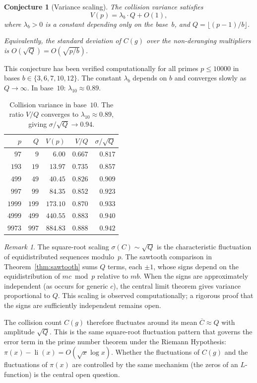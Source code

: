 \documentclass[12pt]{amsart}
\newtheorem{conjecture}[theorem]{Conjecture}
\theoremstyle{definition}
\theoremstyle{remark}
\newtheorem{remark}[theorem]{Remark}
\begin{document}
\begin{conjecture}[Variance scaling]\label{conj:variance}
The collision variance satisfies
\[
V(p) = \lambda_b \cdot Q + O(1),
\]
where $\lambda_b > 0$ is a constant depending only on the
base~$b$, and $Q = \lfloor (p{-}1)/b \rfloor$.

Equivalently, the standard deviation of $C(g)$ over the
non-deranging multipliers is $O(\sqrt{Q}) = O(\sqrt{p/b})$.
\end{conjecture}

This conjecture has been verified computationally for all primes
$p \le 10000$ in bases $b \in \{3, 6, 7, 10, 12\}$. The
constant $\lambda_b$ depends on $b$ and converges slowly as
$Q \to \infty$. In base~$10$: $\lambda_{10} \approx 0.89$.

\begin{table}[h]
\centering
\begin{tabular}{rrrrr}
\toprule
$p$ & $Q$ & $V(p)$ & $V/Q$ & $\sigma/\!\sqrt{Q}$ \\
\midrule
$97$ & $9$ & $6.00$ & $0.667$ & $0.817$ \\
$193$ & $19$ & $13.97$ & $0.735$ & $0.857$ \\
$499$ & $49$ & $40.45$ & $0.826$ & $0.909$ \\
$997$ & $99$ & $84.35$ & $0.852$ & $0.923$ \\
$1999$ & $199$ & $173.10$ & $0.870$ & $0.933$ \\
$4999$ & $499$ & $440.55$ & $0.883$ & $0.940$ \\
$9973$ & $997$ & $884.83$ & $0.888$ & $0.942$ \\
\bottomrule
\end{tabular}
\caption{Collision variance in base~$10$. The ratio $V/Q$
converges to $\lambda_{10} \approx 0.89$, giving
$\sigma/\!\sqrt{Q} \to 0.94$.}
\label{tab:variance}
\end{table}

\begin{remark}
The square-root scaling $\sigma(C) \sim \sqrt{Q}$ is the
characteristic fluctuation of equidistributed sequences
modulo~$p$. The sawtooth comparison in
Theorem~\ref{thm:sawtooth} sums $Q$ terms, each $\pm 1$, whose
signs depend on the equidistribution of $mc \bmod p$ relative to
$mb$. When the signs are approximately independent (as occurs for
generic $c$), the central limit theorem gives variance
proportional to $Q$. This scaling is observed computationally;
a rigorous proof that the signs are sufficiently independent
remains open.

The collision count $C(g)$ therefore fluctuates around its mean
$\overline{C} \approx Q$ with amplitude $\sqrt{Q}$. This is
the same square-root fluctuation pattern that governs the error
term in the prime number theorem under the Riemann Hypothesis:
$\pi(x) - \operatorname{li}(x) = O(\sqrt{x} \log x)$.
Whether the fluctuations of $C(g)$ and the fluctuations of
$\pi(x)$ are controlled by the same mechanism (the zeros of an
$L$-function) is the central open question.
\end{remark}
\end{document}
